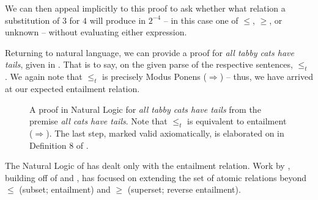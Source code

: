\begin{prooftree}
\end{prooftree}

We can then appeal implicitly to this proof to ask whether what relation
  a substitution of $3$ for $4$ will produce in $2^{-4}$ -- in this case
  one of $\leq$, $\geq$, or unknown -- without evaluating either
  expression.


Returning to natural language, we can provide a proof for
  \textit{all tabby cats have tails}, given in .
That is to say, on the given parse of the respective sentences,
   $\leq_t$ .
We again note that $\leq_t$ is precisely Modus
  Ponens ($\Rightarrow$) -- thus, we have arrived at our expected
  entailment relation.

\begin{figure*}
  \begin{prooftree}
  \end{prooftree}
\caption{\label{fig:catsproof}
  A proof in Natural Logic for \textit{all tabby cats have tails} from
    the premise \textit{all cats have tails}.
  Note that $\le_t$ is equivalent to entailment ($\Rightarrow$).
  The last step, marked valid axiomatically, is elaborated on in
    Definition 8 of .
} 
\end{figure*}


%
%
The Natural Logic of  has dealt only with the
  entailment relation.
Work by , building off of
   and
  ,
  has focused on extending the set of atomic relations
  beyond $\leq$ (subset; entailment) and 
  $\geq$ (superset; reverse entailment).

